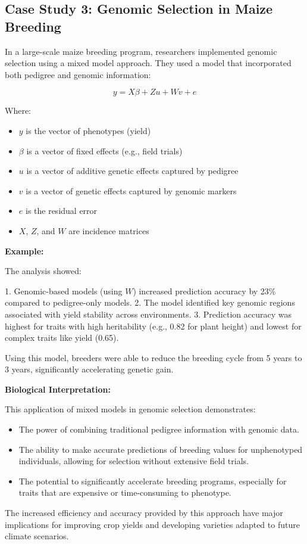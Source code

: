 \documentclass[12pt,a4paper]{article}
\newenvironment{example}[1][]
{\begin{basebox}[linecolor=uqgold]
\textbf{\color{uqgold}Example:} \textit{#1}\par\noindent\ignorespaces}
{\end{basebox}}
\newenvironment{interpretation}[1][]
{\begin{basebox}[linecolor=uqgreen]
\textbf{\color{uqgreen}Biological Interpretation:} \textit{#1}\par\noindent\ignorespaces}
{\end{basebox}}
\begin{document}
\subsection{Case Study 3: Genomic Selection in Maize Breeding}

In a large-scale maize breeding program, researchers implemented genomic selection using a mixed model approach. They used a model that incorporated both pedigree and genomic information:

\[
y = X\beta + Zu + Wv + e
\]

Where:
\begin{itemize}
    \item $y$ is the vector of phenotypes (yield)
    \item $\beta$ is a vector of fixed effects (e.g., field trials)
    \item $u$ is a vector of additive genetic effects captured by pedigree
    \item $v$ is a vector of genetic effects captured by genomic markers
    \item $e$ is the residual error
    \item $X$, $Z$, and $W$ are incidence matrices
\end{itemize}

\begin{example}
The analysis showed:

1. Genomic-based models (using $W$) increased prediction accuracy by 23\% compared to pedigree-only models.
2. The model identified key genomic regions associated with yield stability across environments.
3. Prediction accuracy was highest for traits with high heritability (e.g., 0.82 for plant height) and lowest for complex traits like yield (0.65).

Using this model, breeders were able to reduce the breeding cycle from 5 years to 3 years, significantly accelerating genetic gain.
\end{example}

\begin{interpretation}
This application of mixed models in genomic selection demonstrates:
\begin{itemize}
    \item The power of combining traditional pedigree information with genomic data.
    \item The ability to make accurate predictions of breeding values for unphenotyped individuals, allowing for selection without extensive field trials.
    \item The potential to significantly accelerate breeding programs, especially for traits that are expensive or time-consuming to phenotype.
\end{itemize}
The increased efficiency and accuracy provided by this approach have major implications for improving crop yields and developing varieties adapted to future climate scenarios.
\end{interpretation}
\end{document}
